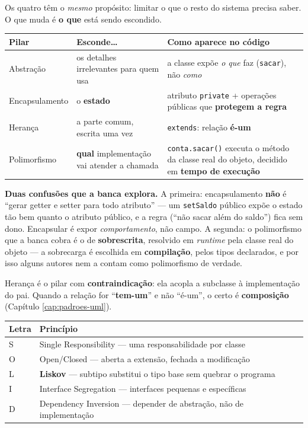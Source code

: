 \begin{conceito}
Os quatro têm o \emph{mesmo} propósito: limitar o que o resto do sistema
precisa saber. O que muda é \textbf{o que} está sendo escondido.

\begin{center}
\begin{tabular}{@{}p{2.7cm}p{4.1cm}p{4.5cm}@{}}
\toprule
\textbf{Pilar} & \textbf{Esconde\ldots} & \textbf{Como aparece no código} \\
\midrule
Abstração & os detalhes irrelevantes para quem usa & a classe expõe
\emph{o que} faz (\texttt{sacar}), não \emph{como} \\
Encapsulamento & o \textbf{estado} & atributo \texttt{private} + operações
públicas que \textbf{protegem a regra} \\
Herança & a parte comum, escrita uma vez & \texttt{extends}: relação
\textbf{é-um} \\
Polimorfismo & \textbf{qual} implementação vai atender a chamada &
\texttt{conta.sacar()} executa o método da classe real do objeto, decidido em
\textbf{tempo de execução} \\
\bottomrule
\end{tabular}
\end{center}

\textbf{Duas confusões que a banca explora.} A primeira: encapsulamento
\textbf{não} é ``gerar getter e setter para todo atributo'' --- um
\texttt{setSaldo} público expõe o estado tão bem quanto o atributo público, e a
regra (``não sacar além do saldo'') fica sem dono. Encapsular é expor
\emph{comportamento}, não campo. A segunda: o polimorfismo que a banca cobra é
o de \textbf{sobrescrita}, resolvido em \emph{runtime} pela classe real do
objeto --- a sobrecarga é escolhida em \textbf{compilação}, pelos tipos
declarados, e por isso alguns autores nem a contam como polimorfismo de
verdade.

Herança é o pilar com \textbf{contraindicação}: ela acopla a subclasse à
implementação do pai. Quando a relação for ``\textbf{tem-um}'' e não
``é-um'', o certo é \textbf{composição} (Capítulo \ref{cap:padroes-uml}).
\end{conceito}

\begin{center}
\begin{tabular}{@{}p{1.2cm}p{9.6cm}@{}}
\toprule
\textbf{Letra} & \textbf{Princípio} \\
\midrule
S & Single Responsibility --- uma responsabilidade por classe \\
O & Open/Closed --- aberta a extensão, fechada a modificação \\
L & \textbf{Liskov} --- subtipo substitui o tipo base sem quebrar o programa \\
I & Interface Segregation --- interfaces pequenas e específicas \\
D & Dependency Inversion --- depender de abstração, não de implementação \\
\bottomrule
\end{tabular}
\end{center}

